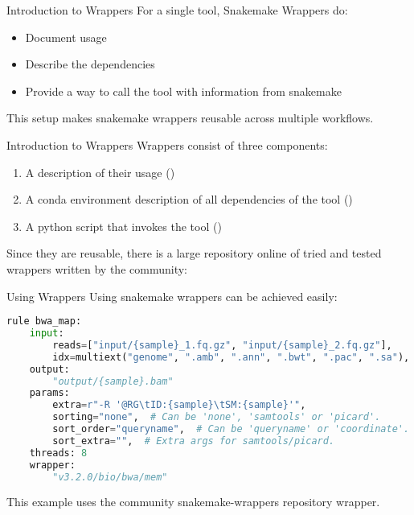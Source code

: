 \begin{frame}{Introduction to Wrappers}
    For a single tool, Snakemake Wrappers do:
    \begin{itemize}[<+->]
        \item Document usage
        \item Describe the dependencies
        \item Provide a way to call the tool with information from snakemake
    \end{itemize}
    This setup makes snakemake wrappers reusable across multiple workflows.
\end{frame}

\begin{frame}{Introduction to Wrappers}
    Wrappers consist of three components:
    \begin{enumerate}
        \item A description of their usage ()
        \item A conda environment description of all dependencies of the tool ()
        \item A python script that invokes the tool ()
    \end{enumerate}
    Since they are reusable, there is a large repository online of tried and tested 
    wrappers written by the community: 
\end{frame}

\begin{frame}[fragile]{Using Wrappers}
    Using snakemake wrappers can be achieved easily:
    \begin{lstlisting}[language=Python,style=Python]
rule bwa_map:
    input:
        reads=["input/{sample}_1.fq.gz", "input/{sample}_2.fq.gz"],
        idx=multiext("genome", ".amb", ".ann", ".bwt", ".pac", ".sa"),
    output:
        "output/{sample}.bam"
    params:
        extra=r"-R '@RG\tID:{sample}\tSM:{sample}'",
        sorting="none",  # Can be 'none', 'samtools' or 'picard'.
        sort_order="queryname",  # Can be 'queryname' or 'coordinate'.
        sort_extra="",  # Extra args for samtools/picard.
    threads: 8
    wrapper:
        "v3.2.0/bio/bwa/mem"
    \end{lstlisting}
    \begin{docs}
        This example uses the community snakemake-wrappers repository  wrapper.
    \end{docs}
\end{frame}

